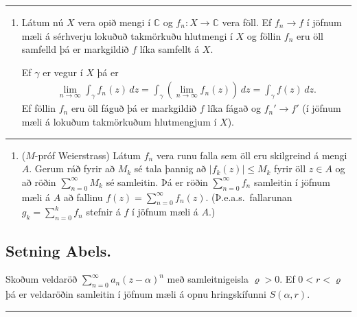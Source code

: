 \documentclass[a4paper,10pt,icelandic]{sphinxmanual}
\begin{document}
\bigskip\hrule\bigskip

\begin{enumerate}
%
\setcounter{enumi}{1}
\item {} 
Látum nú \(X\) vera opið mengi í \({\mathbb{C}}\) og \(f_n:X\rightarrow {\mathbb{C}}\) vera föll. Ef \(f_n\rightarrow f\) í jöfnum mæli á sérhverju lokuðuð takmörkuðu hlutmengi í \(X\) og föllin \(f_n\) eru öll samfelld þá er markgildið \(f\) líka samfellt á \(X\).

Ef \(\gamma\) er vegur í \(X\) þá er
\begin{equation*}
\begin{split}\lim_{n\rightarrow \infty}\int_\gamma f_n(z)\,dz=
\int_\gamma \left(\lim_{n\rightarrow \infty}f_n(z)\right)\,dz=\int_\gamma f(z)\,dz.\end{split}
\end{equation*}
Ef föllin \(f_n\) eru öll fáguð þá er markgildið \(f\) líka fágað og \(f_n'\rightarrow f'\) (í jöfnum mæli á lokuðum takmörkuðum hlutmengjum í \(X\)).

\end{enumerate}


\bigskip\hrule\bigskip

\begin{enumerate}
%
\setcounter{enumi}{2}
\item {} 
(\(M\)-próf Weierstrass) Látum \(f_n\) vera runu falla sem öll eru skilgreind á mengi \(A\). Gerum ráð fyrir að \(M_k\) sé tala þannig að \(|f_k(z)|\leq M_k\) fyrir öll \(z\in A\) og að röðin \(\sum_{n=0}^\infty M_k\) sé samleitin. Þá er röðin \(\sum_{n=0}^\infty f_n\) samleitin í jöfnum mæli á \(A\) að fallinu \(f(z)=\sum_{n=0}^\infty f_n(z)\). (Þ.e.a.s. fallarunan \(g_k=\sum_{n=0}^k f_n\) stefnir á \(f\) í jöfnum mæli á \(A\).)

\end{enumerate}


\subsection{Setning Abels.}
\label{\detokenize{Kafli03:setning-abels}}
Skoðum veldaröð \(\sum_{n=0}^\infty a_n(z-\alpha)^n\) með samleitnigeisla \(\varrho>0\). Ef \(0<r<\varrho\) þá er veldaröðin samleitin í jöfnum mæli á opnu hringskífunni \({S}(\alpha,r)\).


\bigskip\hrule\bigskip
\end{document}
